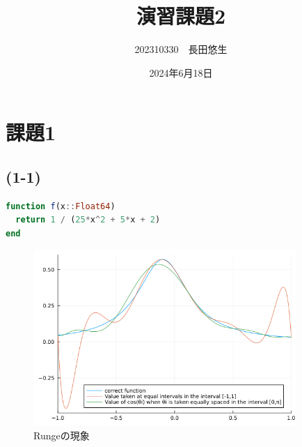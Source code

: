 \documentclass[uplatex, dvipdfmx, a4j,11pt]{jsarticle}
\title{演習課題2}
\author{202310330　長田悠生}
\date{2024年6月18日}
\begin{document}
\section*{課題1}
\subsection*{(1-1)}
\begin{lstlisting}[title={(1-1)}, label=code:in, language=Julia]
function f(x::Float64)
  return 1 / (25*x^2 + 5*x + 2)
end
\end{lstlisting}


\begin{figure}[h]
  \begin{center}
    \includegraphics[width=100mm]{runge.png}
    \caption{Rungeの現象}
  \end{center}
\end{figure}

\end{document}
